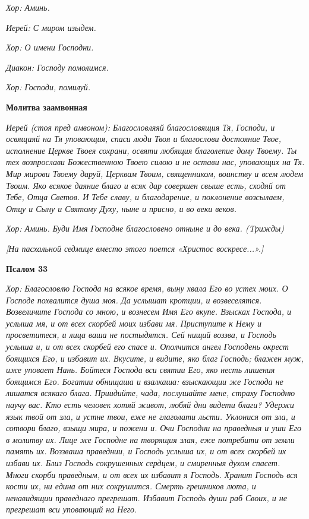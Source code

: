 \itshape Хор:\normalfont{} Аминь.


\itshape Иерей:\normalfont{} С миром изыдем.


\itshape Хор:\normalfont{} О имени Господни.


\itshape Диакон:\normalfont{} Господу помолимся.


\itshape Хор:\normalfont{} Господи, помилуй.





\bfseries Молитва заамвонная\normalfont{}


\itshape Иерей (стоя пред амвоном):\normalfont{} Благословляяй благословящия Тя, Господи, и освящаяй на Тя уповающия, спаси люди Твоя и благослови достояние Твое, исполнение Церкве Твоея сохрани, освяти любящия благолепие дому Твоему. Ты тех возпрослави Божественною Твоею силою и не остави нас, уповающих на Тя. Мир мирови Твоему даруй, Церквам Твоим, священником, воинству и всем людем Твоим. Яко всякое даяние благо и всяк дар совершен свыше есть, сходяй от Тебе, Отца Светов. И Тебе славу, и благодарение, и поклонение возсылаем, Отцу и Сыну и Святому Духу, ныне и присно, и во веки веков.


\itshape Хор:\normalfont{} Аминь. Буди Имя Господне благословено отныне и до века. \itshape (Tрижды)\normalfont{}


\itshape [На пасхальной седмице вместо этого поется «Христос воскресе...».]\normalfont{}





\bfseries  Псалом 33\normalfont{}


\itshape Хор:\normalfont{} Благословлю Господа на всякое время, выну хвала Его во устех моих. О Господе похвалится душа моя. Да услышат кротции, и возвеселятся. Возвеличите Господа со мною, и вознесем Имя Его вкупе. Взысках Господа, и услыша мя, и от всех скорбей моих избави мя. Приступите к Нему и просветитеся, и лица ваша не постыдятся. Сей нищий воззва, и Господь услыша и, и от всех скорбей его спасе и. Ополчится ангел Господень окрест боящихся Его, и избавит их. Вкусите, и видите, яко благ Господь; блажен муж, иже уповает Нань. Бойтеся Господа вси святии Его, яко несть лишения боящимся Его. Богатии обнищаша и взалкаша: взыскающии же Господа не лишатся всякаго блага. Приидийте, чада, послушайте мене, страху Господню научу вас. Кто есть человек хотяй живот, любяй дни видети благи? Удержи язык твой от зла, и устне твои, еже не глаголати льсти. Уклонися от зла, и сотвори благо, взыщи мира, и пожени и. Очи Господни на праведныя и уши Его в молитву их. Лице же Господне на творящия злая, еже потребити от земли память их. Воззваша праведнии, и Господь услыша их, и от всех скорбей их избави их. Близ Господь сокрушенных сердцем, и смиренныя духом спасет. Многи скорби праведным, и от всех их избавит я Господь. Хранит Господь вся кости их, ни едина от них сокрушится. Смерть грешников люта, и ненавидящии праведнаго прегрешат. Избавит Господь души раб Своих, и не прегрешат вси уповающий на Него.


